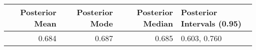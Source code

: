 \begin{tabular}{rrrl}
\toprule
Posterior Mean & Posterior Mode & Posterior Median & Posterior Intervals (0.95) \\
\midrule
0.684 & 0.687 & 0.685 & 0.603, 0.760 \\
\bottomrule
\end{tabular}
